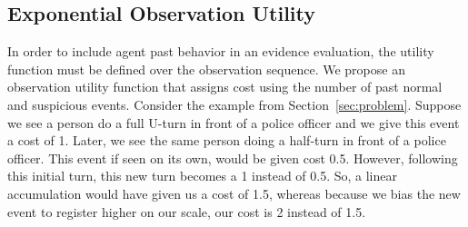 




%
%


\subsection{Exponential Observation Utility}
\label{sec:FUPR}
\noindent
In order to include agent past behavior in an evidence evaluation, the utility function must be defined over the observation sequence.  We propose an observation utility function that assigns cost using the number of past normal and suspicious events.
%
Consider the example from Section~\ref{sec:problem}. Suppose we see a person do a full U-turn in front of a police officer and we give this event a cost of 1. Later, we see the same person doing a half-turn in front of a police officer. This event if seen on its own, would be given cost 0.5. However, following this initial turn, this new turn becomes a 1 instead of 0.5. So, a linear accumulation would have given us a cost of 1.5, whereas because we bias the new event to register higher on our scale, our cost is 2 instead of 1.5.


